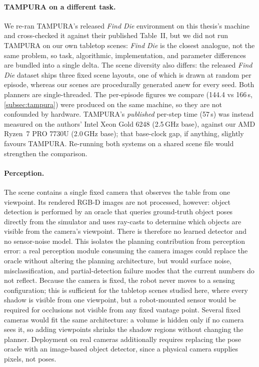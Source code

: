 \paragraph{TAMPURA on a different task.} We re-ran TAMPURA's released
\emph{Find Die} environment on this thesis's machine and cross-checked it
against their published Table~II, but we did not run TAMPURA on our own
tabletop scenes: \emph{Find Die} is the closest analogue, not the same
problem, so task, algorithmic, implementation, and parameter differences
are bundled into a single delta. The scene diversity also differs: the
released \emph{Find Die} dataset ships three fixed scene layouts, one of
which is drawn at random per episode, whereas our scenes are procedurally
generated anew for every seed. Both planners are single-threaded. The per-episode figures we compare
(144.4 vs 166\,s, \cref{subsec:tampura}) were produced on the same machine, so
they are not confounded by hardware. TAMPURA's \emph{published} per-step time
(57\,s) was instead measured on the authors' Intel Xeon Gold 6248 (2.5\,GHz
base), against our AMD Ryzen~7 PRO 7730U (2.0\,GHz base); that base-clock gap,
if anything, slightly favours TAMPURA.
Re-running both systems on a shared scene file would strengthen the
comparison.

\paragraph{Perception.} The scene contains a single fixed camera
that observes the table from one viewpoint. Its rendered RGB-D images are not processed,
however: object detection is performed by an oracle that queries
ground-truth object poses directly from the simulator and uses ray-casts to
determine which objects are visible from the camera's viewpoint. There is
therefore no learned detector and no sensor-noise model. This isolates the
planning contribution from perception error: a real perception module
consuming the camera images could replace the oracle without altering the
planning architecture, but would surface noise, misclassification, and
partial-detection failure modes that the current numbers do not reflect. Because the camera is fixed, the robot never moves
to a sensing configuration; this is sufficient for the tabletop scenes
studied here, where every shadow is visible from one viewpoint, but a
robot-mounted sensor would be required for occlusions not visible from any
fixed vantage point. Several fixed cameras would fit the same architecture:
a volume is hidden only if no camera sees it, so adding viewpoints shrinks
the shadow regions without changing the planner. Deployment on real cameras
additionally requires replacing the pose oracle with an image-based object
detector, since a physical camera supplies pixels, not poses.

